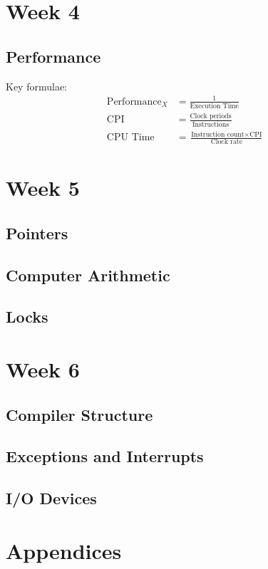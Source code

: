 \documentclass{article}
\begin{document}
\section{Week 4}
\subsection{Performance}
\label{sec:perf}
Key formulae:
\begin{align}
	\text{Performance}_X&=\frac{1}{\text{Execution Time}}\\
	\text{CPI}&=\frac{\text{Clock periods}}{\text{Instructions}}\\
	\text{CPU Time} &=\frac{\text{Instruction count}\times\text{CPI}}{\text{Clock rate}}
\end{align}
\section{Week 5}
\subsection{Pointers}
\subsection{Computer Arithmetic}
\subsection{Locks}
\section{Week 6}
\subsection{Compiler Structure}
\subsection{Exceptions and Interrupts}
\subsection{I/O Devices}

\section{Appendices}
\end{document}
